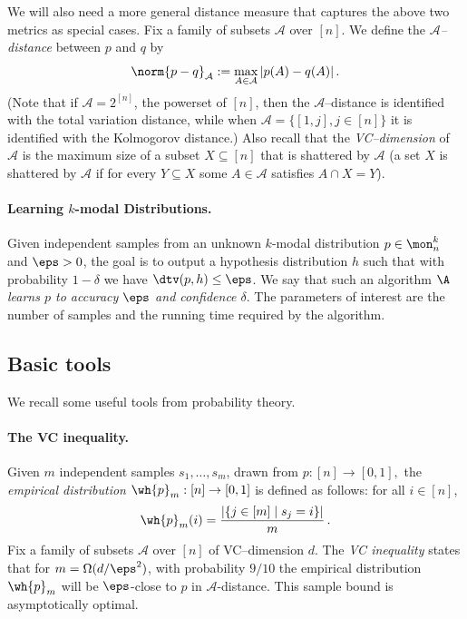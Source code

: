 {We will also need a more general distance measure that captures the above two metrics as special cases.
Fix a family of subsets $\mathcal{A}$ over $[n]$. 
We define the \emph{$\mathcal{A}$--distance} between $p$ and $q$ by 
\[
\norm {p-q}_{\mathcal{A}}
:= \max_{A\in \mathcal{A}} |p(A) - q(A)|\,.
\]
(Note that if $\mathcal{A} = 2^{[n]}$, the powerset of $[n]$, then  the 
$\mathcal{A}$--distance is identified with the total variation distance, while when $\mathcal{A} = \{ [1, j], j \in [n]\}$ 
it is identified with the Kolmogorov distance.)
Also recall that the \emph{VC--dimension} of $\mathcal A$ is the maximum size 
of a subset $X\subseteq [n]$ that is shattered by $\mathcal A$ (a set $X$ is shattered by
$\mathcal A$ if for every $Y \subseteq X$ some $A\in\mathcal A$ satisfies $A\cap X = Y$).
}


\paragraph{Learning $k$-modal Distributions.}  Given
independent samples from an unknown $k$-modal distribution
$p \in \mon^k_n$ and $\eps>0$, the goal is to output a hypothesis
distribution $h$ such that with probability $1-\delta$ we have
$\dtv(p,h) \leq \eps$.  We say that such an algorithm $\A$
\emph{learns $p$ to accuracy $\eps$ and confidence $\delta$}. The
parameters of interest are the number of samples and the running time
required by the algorithm.

\subsection{Basic tools} \label{ssec:tools}

We recall some useful tools from probability theory.

\paragraph{The VC inequality.}
Given $m$ independent samples $s_1,\dots,s_m$, drawn from $p:[n] \to [0,1],$
the \emph{empirical distribution} $\wh{p}_m : [n] \to [0,1]$ is defined as
follows: for all $i \in [n]$,
\[
\wh{p}_m(i) = \frac{|\{j \in [m] \mid s_j=i\}|}{m}\,.
\]
Fix a family of subsets $\mathcal{A}$ over $[n]$ of VC--dimension $d$. 
The \emph{VC inequality} states that for $m=\Omega(d/\eps^2)$,
with probability $9/10$ the {empirical distribution} $\wh{p}_m$ will be
$\eps$-close to $p$ in $\mathcal{A}$-distance.
This sample bound is asymptotically optimal.

